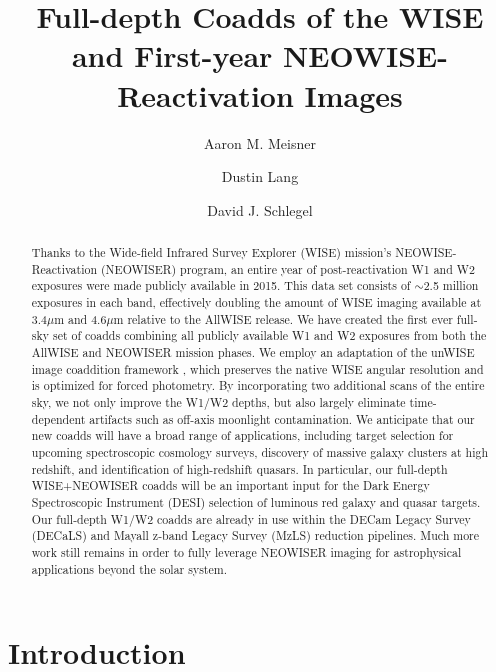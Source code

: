 \documentclass{emulateapj}
\begin{document}
 
\title{Full-depth Coadds of the WISE and First-year NEOWISE-Reactivation Images}

\author{Aaron M. Meisner}
\author{Dustin Lang}
\author{David J. Schlegel}


\begin{abstract} 
Thanks to the Wide-field Infrared Survey Explorer (WISE) mission's
NEOWISE-Reactivation (NEOWISER) program, an entire year of post-reactivation W1
and W2 exposures were made publicly available in 2015. This data set consists of
$\sim$2.5 million exposures in each band, effectively doubling the amount
of WISE imaging available at 3.4$\mu$m and 4.6$\mu$m relative to the AllWISE
release. We have created the first ever full-sky set of coadds combining all 
publicly available W1 and W2 exposures from both the AllWISE and 
NEOWISER mission phases. We employ an adaptation of the unWISE image coaddition
framework \citep{lang14}, which preserves the native WISE angular resolution 
and is optimized for forced photometry. By incorporating two additional scans
of the entire sky, we not only improve the W1/W2 depths, but also largely
eliminate time-dependent artifacts such as off-axis moonlight contamination.
We anticipate that our new coadds will have a broad range of 
applications, including target selection for upcoming spectroscopic cosmology 
surveys, discovery of massive galaxy clusters at high redshift, and 
identification of high-redshift quasars. In particular, our full-depth 
WISE+NEOWISER coadds will be an important input for the Dark Energy 
Spectroscopic Instrument (DESI) selection of luminous red galaxy and quasar 
targets. Our full-depth W1/W2 coadds are already in use within the 
DECam Legacy Survey (DECaLS) and Mayall z-band Legacy Survey (MzLS) reduction 
pipelines. Much more work still remains in order to fully leverage NEOWISER 
imaging for astrophysical applications beyond the solar system.
\end{abstract}  
 

\section{Introduction}
\end{document}
